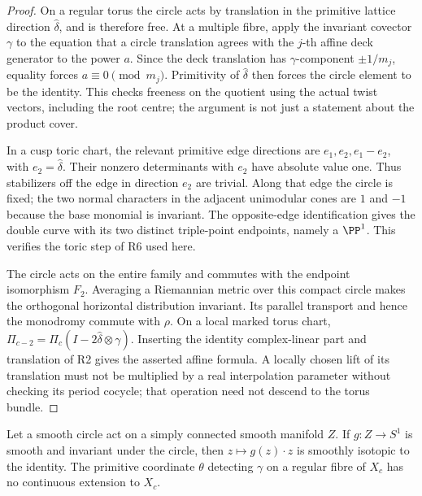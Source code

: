 \begin{proof}
On a regular torus the circle acts by translation in the primitive
lattice direction $\widehat\delta$, and is therefore free.
At a multiple fibre, apply the invariant covector $\gamma$ to the
equation that a circle translation agrees with the $j$-th affine
deck generator to the power $a$. Since the deck translation has
$\gamma$-component $\pm1/m_j$, equality forces
$a\equiv0\pmod{m_j}$. Primitivity of $\widehat\delta$ then
forces the circle element to be the identity. This checks freeness
on the quotient using the actual twist vectors, including the root
centre; the argument is not just a statement about the product cover.

In a cusp toric chart, the relevant primitive edge directions are
$e_1,e_2,e_1-e_2$, with $e_2=\widehat\delta$.
Their nonzero determinants with $e_2$ have absolute value one.
Thus stabilizers off the edge in direction $e_2$ are trivial. Along
that edge the circle is fixed; the two normal characters in the
adjacent unimodular cones are $1$ and $-1$ because the base monomial
is invariant. The opposite-edge identification gives the double
curve with its two distinct triple-point endpoints, namely a
$\PP^1$. This verifies the toric step of R6 used here.

The circle acts on the entire family and commutes with the endpoint
isomorphism $F_2$. Averaging a Riemannian metric over this compact
circle makes the orthogonal horizontal distribution invariant.
Its parallel transport and hence the monodromy commute with $\rho$.
On a local marked torus chart,
$\Pi_{c-2}=\Pi_c(I-2\widehat\delta\otimes\gamma)$.
Inserting the identity complex-linear part and translation of R2
gives the asserted affine formula. A locally chosen lift of its
translation must not be multiplied by a real interpolation parameter
without checking its period cocycle; that operation need not descend
to the torus bundle.
\end{proof}

\begin{proposition}
Let a smooth circle act on a simply connected smooth manifold $Z$.
If $g:Z\to S^1$ is smooth and invariant under the circle, then
$z\mapsto g(z)\cdot z$ is smoothly isotopic to the identity.
The primitive coordinate $\theta$ detecting $\gamma$ on a regular
fibre of $X_c$ has no continuous extension to $X_c$.
\end{proposition}

